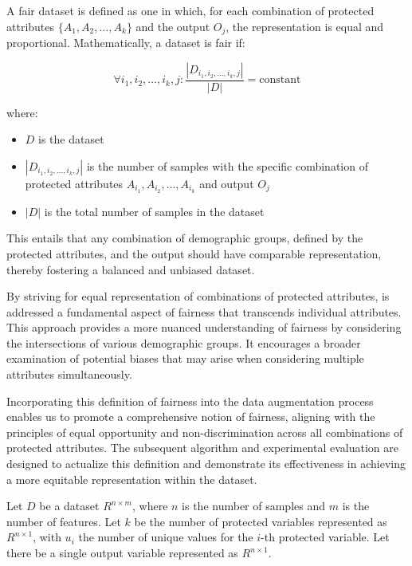 A fair dataset is defined as one in which, for each combination of protected attributes $\{A_1, A_2, \ldots, A_k\}$ and the output $O_j$, the representation is equal and proportional. Mathematically, a dataset is fair if:

\[
\forall i_1, i_2, \ldots, i_k, j: \frac{|D_{i_1, i_2, \ldots, i_k, j}|}{|D|} = \text{constant}
\]

where:
\begin{itemize}

    \item $D$ is the dataset

    \item $|D_{i_1, i_2, \ldots, i_k, j}|$ is the number of samples with the specific combination of protected attributes $A_{i_1}, A_{i_2}, \ldots, A_{i_k}$ and output $O_j$

    \item $|D|$ is the total number of samples in the dataset
    
\end{itemize}

This entails that any combination of demographic groups, defined by the protected attributes, and the output should have comparable representation, thereby fostering a balanced and unbiased dataset.

By striving for equal representation of combinations of protected attributes, is addressed a fundamental aspect of fairness that transcends individual attributes. This approach provides a more nuanced understanding of fairness by considering the intersections of various demographic groups. It encourages a broader examination of potential biases that may arise when considering multiple attributes simultaneously.

Incorporating this definition of fairness into the data augmentation process enables us to promote a comprehensive notion of fairness, aligning with the principles of equal opportunity and non-discrimination across all combinations of protected attributes. The subsequent algorithm and experimental evaluation are designed to actualize this definition and demonstrate its effectiveness in achieving a more equitable representation within the dataset.

Let $D$ be a dataset $R^{n \times m}$, where $n$ is the number of samples and $m$ is the number of features. Let $k$ be the number of protected variables represented as $R^{n \times 1}$, with $u_i$ the number of unique values for the $i$-th protected variable. Let there be a single output variable represented as $R^{n \times 1}$.

